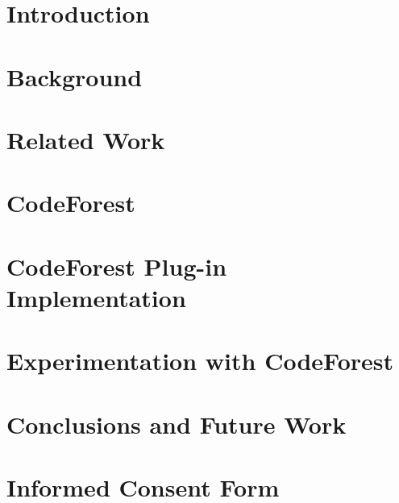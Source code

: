 



\chapter{Introduction}\label{ch:introduction}



\chapter{Background}\label{ch:background}



\chapter{Related Work}\label{ch:related}



\chapter{CodeForest}\label{ch:forest}



\chapter{CodeForest Plug-in Implementation}\label{ch:plugin}



\chapter{Experimentation with CodeForest}\label{ch:cfexperimentation}



\chapter{Conclusions and Future Work}\label{ch:conclusions}



\clearpage
{}


\apendice
\chapter{Informed Consent Form}\label{ch:appendix2}


